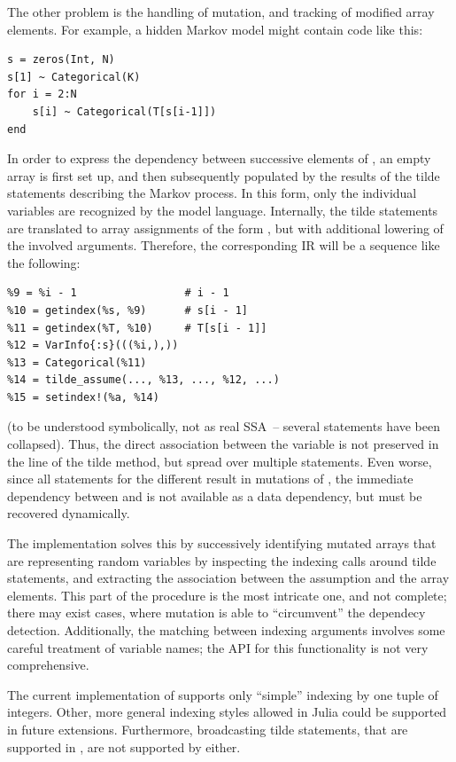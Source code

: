 The other problem is the handling of mutation, and tracking of modified array elements.  For
example, a hidden Markov model might contain code like this:
\begin{lstlisting}
s = zeros(Int, N)
s[1] ~ Categorical(K)
for i = 2:N
    s[i] ~ Categorical(T[s[i-1]])
end
\end{lstlisting}
In order to express the dependency between successive elements of , an empty array is first
set up, and then subsequently populated by the results of the tilde statements describing the Markov
process.  In this form, only the individual variables  are recognized by the model
language.  Internally, the tilde statements are translated to array assignments of the form
, but with additional lowering of the involved arguments.
Therefore, the corresponding IR will be a sequence like the following:
\begin{lstlisting}
%9 = %i - 1                 # i - 1
%10 = getindex(%s, %9)      # s[i - 1]
%11 = getindex(%T, %10)     # T[s[i - 1]]
%12 = VarInfo{:s}(((%i,),))
%13 = Categorical(%11)
%14 = tilde_assume(..., %13, ..., %12, ...)
%15 = setindex!(%a, %14)
\end{lstlisting}
(to be understood symbolically, not as real SSA~-- several statements have been collapsed).  Thus,
the direct association between the variable  is not preserved in the line of the tilde
method, but spread over multiple statements. Even worse, since all statements for the different
 result in mutations of , the immediate dependency between  and
 is not available as a data dependency, but must be recovered dynamically.

The  implementation solves this by successively identifying mutated arrays that are
representing random variables by inspecting the indexing calls around tilde statements, and
extracting the association between the assumption and the array elements.  This part of the
procedure is the most intricate one, and not complete; there may exist cases, where mutation is able
to \enquote{circumvent} the dependecy detection.  Additionally, the matching between indexing
arguments involves some careful treatment of variable names; the \dppljl{} API for this
functionality is not very comprehensive.

The current implementation of \autogibbsjl{} supports only \enquote{simple} indexing by one tuple of
integers.  Other, more general indexing styles allowed in Julia could be supported in future
extensions.  Furthermore, broadcasting tilde statements, that are supported in \dppljl{}, are not
supported by \autogibbsjl{} either.

